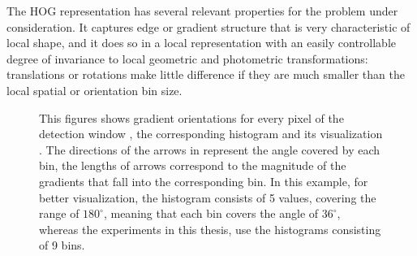 The HOG representation has several relevant properties for the problem under
consideration. It captures edge or gradient structure that is very
characteristic of local shape, and it does so in a local representation with
an easily controllable degree of invariance to local geometric and photometric
transformations: translations or rotations make little difference if they are
much smaller than the local spatial or orientation bin size.

\begin{figure}[th]
\centering
{} \hspace{3mm}
 \hspace{3mm}
\caption{This figures shows gradient orientations for every pixel of the detection window , the corresponding histogram  and its visualization . The directions of the arrows in  represent the angle covered by each bin, the lengths of arrows correspond to the magnitude of the gradients that fall into the corresponding bin. In this example, for better visualization, the histogram consists of 5 values, covering the range of $180^\circ$, meaning that each bin covers the angle of $36^\circ$, whereas the experiments in this thesis, use the histograms consisting of 9 bins.}
\label{fig:hog_simple}
\end{figure}

